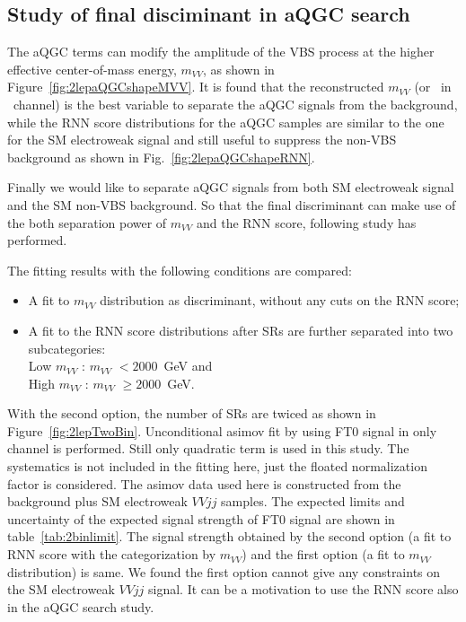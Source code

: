 \subsection{Study of final disciminant in aQGC search}
\label{subsec:2binapproach}
The aQGC terms can modify the amplitude of the VBS process at the higher effective center-of-mass energy, 
$m_{VV}$, as shown in Figure~\ref{fig:2lepaQGCshapeMVV}.
It is found that the reconstructed $m_{VV}$ (or \mt\ in \zlep\ channel) is the best variable to separate the aQGC signals from the background,
while the RNN score distributions for the aQGC samples are similar to the one for the SM electroweak signal and still useful to suppress the non-VBS background as shown in Fig.~\ref{fig:2lepaQGCshapeRNN}.

Finally we would like to separate aQGC signals from both SM electroweak signal and the SM non-VBS background.
So that the final discriminant can make use of the both separation power of $m_{VV}$ and the RNN score, following study has performed.

The fitting results with the following conditions are compared:
\begin{itemize}
  \item A fit to $m_{VV}$ distribution as discriminant, without any cuts on the RNN score;
  \item A fit to the RNN score distributions after
        SRs are further separated into two subcategories: \\
        Low $m_{VV}$ : $m_{VV}$ $< 2000$~GeV and \\
        High $m_{VV}$ : $m_{VV}$ $\geq 2000$~GeV. \\
\end{itemize}
With the second option, the number of SRs are twiced as shown in Figure~\ref{fig:2lepTwoBin}.
Unconditional asimov fit by using FT0 signal in only \tlep channel is performed.
Still only quadratic term is used in this study.
The systematics is not included in the fitting here, just the floated normalization factor is considered.
The asimov data used here is constructed from the background plus SM electroweak $VVjj$ samples.
The expected limits and uncertainty of the expected signal strength of FT0 signal are shown in table~\ref{tab:2binlimit}.
The signal strength obtained by the second option (a fit to RNN score with the categorization by $m_{VV}$) and the first option (a fit to $m_{VV}$ distribution) is same. 
We found the first option cannot give any constraints on the SM electroweak $VVjj$ signal.
It can be a motivation to use the RNN score also in the aQGC search study.

